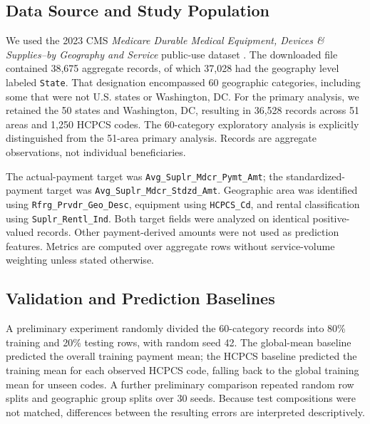 \subsection{Data Source and Study Population}
We used the 2023 CMS \emph{Medicare Durable Medical Equipment, Devices \& Supplies--by Geography and Service} public-use dataset \citep{cmsdme2023}. The downloaded file contained 38,675 aggregate records, of which 37,028 had the geography level labeled \texttt{State}. That designation encompassed 60 geographic categories, including some that were not U.S. states or Washington, DC. For the primary analysis, we retained the 50 states and Washington, DC, resulting in 36,528 records across 51 areas and 1,250 HCPCS codes. The 60-category exploratory analysis is explicitly distinguished from the 51-area primary analysis. Records are aggregate observations, not individual beneficiaries.

The actual-payment target was \texttt{Avg\_Suplr\_Mdcr\_Pymt\_Amt}; the standardized-payment target was \texttt{Avg\_Suplr\_Mdcr\_Stdzd\_Amt}. Geographic area was identified using \texttt{Rfrg\_Prvdr\_Geo\_Desc}, equipment using \texttt{HCPCS\_Cd}, and rental classification using \texttt{Suplr\_Rentl\_Ind}. Both target fields were analyzed on identical positive-valued records. Other payment-derived amounts were not used as prediction features. Metrics are computed over aggregate rows without service-volume weighting unless stated otherwise.

\subsection{Validation and Prediction Baselines}
A preliminary experiment randomly divided the 60-category records into 80\% training and 20\% testing rows, with random seed 42. The global-mean baseline predicted the overall training payment mean; the HCPCS baseline predicted the training mean for each observed HCPCS code, falling back to the global training mean for unseen codes. A further preliminary comparison repeated random row splits and geographic group splits over 30 seeds. Because test compositions were not matched, differences between the resulting errors are interpreted descriptively.

